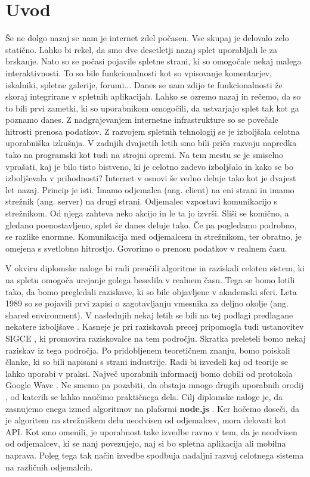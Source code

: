 \documentclass[a4paper, 12pt, twoside]{book}
\begin{document}
\chapter{Uvod}

Še ne dolgo nazaj se nam je internet zdel počasen. Vse skupaj je delovalo zelo statično. Lahko bi rekel, da smo dve desetletji nazaj splet uporabljali le za brskanje. Nato so se počasi pojavile spletne strani, ki so omogočale nekaj malega interaktivnosti. To so bile funkcionalnosti kot so vpisovanje komentarjev, iskalniki, spletne galerije, forumi... Danes se nam zdijo te funkcionalnosti že skoraj integrirane v spletnih aplikacijah. Lahko se ozremo nazaj in rečemo, da so to bili prvi zametki, ki so uporabnikom omogočili, da ustvarjajo splet tak kot ga poznamo danes. Z nadgrajevanjem internetne infrastrukture so se povečale hitrosti prenosa podatkov. Z razvojem spletnih tehnologij se je izboljšala celotna uporabniška izkušnja. V zadnjih dvajsetih letih smo bili priča razvoju napredka tako na programski kot tudi na strojni opremi. Na tem mestu se je smiselno vprašati, kaj je bilo tisto bistveno, ki je celotno zadevo izboljšalo in kako se bo izboljševala v prihodnosti? Internet v osnovi še vedno deluje tako kot je dvajest let nazaj. Princip je isti. Imamo odjemalca (ang. client) na eni strani in imamo strežnik (ang. server) na drugi strani. Odjemalec vzpostavi komunikacijo s strežnikom. Od njega zahteva neko akcijo in le ta jo izvrši. Sliši se komično, a gledano poenostavljeno, splet še danes deluje tako. Če pa pogledamo podrobno, se razlike enormne. Komunikacija med odjemalcem in strežnikom, ter obratno, je omejena s svetlobno hitrostjo. Govorimo o prenosu podatkov v realnem času.

V okviru diplomske naloge bi radi preučili algoritme in raziskali celoten sistem, ki na spletu omogoča urejanje golega besedila v realnem času. Tega se bomo lotili tako, da bomo pregledali raziskave, ki so bile objavljene v akademski sferi. Leta 1989 so se pojavili prvi zapisi \cite{ccigs} o zagotavljanju vmesnika za deljno okolje  (ang. shared environment). V naslednjih nekaj letih se bili na tej podlagi predlagane nekatere izboljšave \cite{hllbw}. Kasneje je pri raziskavah precej pripomogla tudi ustanovitev SIGCE \cite{sigce}, ki promovira raziskovalce na tem področju. Skratka preleteli bomo nekaj raziskav iz tega področja. Po pridobljenem teoretičnem znanju, bomo poiskali članke, ki so bili napisani s strani industrije. Radi bi izvedeli kaj od teorije se lahko uporabi v praksi. Največ uporabnih informacij bomo dobili od protokola Google Wave \cite{wave-ot}. Ne smemo pa pozabiti, da obstaja mnogo drugih uporabnih orodij \cite{share}, od katerih se lahko naučimo praktičnega dela. Cilj diplomske naloge je, da zasnujemo enega izmed algoritmov na plaformi \textbf{node.js} \cite{node}.  Ker hočemo doseči, da je algoritem na strežniškem delu neodvisen od odjemalcev, mora delovati kot API. Kot smo omenili, je uporabnost take izvedbe ravno v tem, da je neodvisen od odjemalcev, ki se nanj povezujejo, naj si bo spletna aplikacija ali mobilna naprava. Poleg tega tak način izvedbe spodbuja nadaljni razvoj celotnega sistema na različnih odjemalcih.
\end{document}
